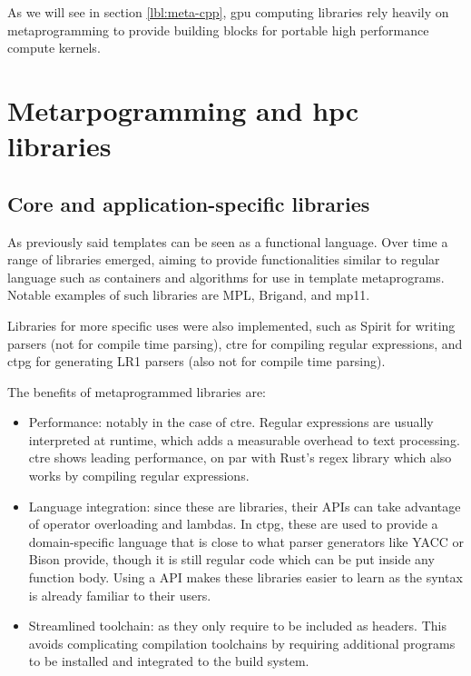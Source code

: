 \documentclass[../main]{subfiles}
\begin{document}
As we will see in section \ref{lbl:meta-cpp}, \gls{gpu} computing libraries
rely heavily on \cpp metaprogramming to provide building blocks for
portable high performance compute kernels.

\section{
  Metarpogramming and \gls{hpc} libraries
}
\label{lbl:meta-libraries}

\subsection{Core and application-specific libraries}

As previously said \cpp templates can be seen as a functional language.
Over time a range of libraries emerged, aiming to provide functionalities
similar to regular language such as containers and algorithms for use in
template metaprograms. Notable examples of such libraries are MPL\cite{mpl},
Brigand\cite{brigand}, and mp11\cite{mp11}.

Libraries for more specific uses were also implemented, such as
Spirit\cite{spirit} for writing parsers (not for compile time parsing),
\gls{ctre} \cite{ctre} for compiling regular expressions,
and \gls{ctpg} \cite{ctpg} for generating LR1 parsers
(also not for compile time parsing).

The benefits of metaprogrammed libraries are:

\begin{itemize}

\item Performance: notably in the case of \gls{ctre}.
Regular expressions are usually interpreted at runtime,
which adds a measurable overhead to text processing.
\gls{ctre} shows leading performance, on par with Rust's regex library
which also works by compiling regular expressions.

\item Language integration: since these are \cpp libraries,
their APIs can take advantage of \cpp operator overloading and lambdas.
In \gls{ctpg}, these are used to provide a domain-specific language that is close to
what parser generators like YACC or Bison provide,
though it is still regular \cpp code which can be put inside any function body.
Using a \cpp API makes these libraries easier to learn
as the syntax is already familiar to their users.

\item Streamlined toolchain: as they only require to be included as headers.
This avoids complicating compilation toolchains by requiring additional programs
to be installed and integrated to the build system.

\end{itemize}
\end{document}
